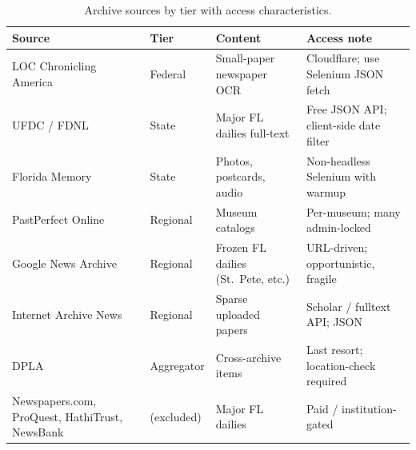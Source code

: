 \documentclass[11pt,letterpaper]{article}
\begin{document}
\begin{table}[H]
\centering
\small
\begin{tabular}{@{}p{3.2cm}p{2.2cm}p{4.2cm}p{4.8cm}@{}}
\toprule
\textbf{Source} & \textbf{Tier} & \textbf{Content} & \textbf{Access note} \\
\midrule
LOC Chronicling America & Federal & Small-paper newspaper OCR & Cloudflare; use Selenium JSON fetch \\
UFDC / FDNL & State & Major FL dailies full-text & Free JSON API; client-side date filter \\
Florida Memory & State & Photos, postcards, audio & Non-headless Selenium with warmup \\
PastPerfect Online & Regional & Museum catalogs & Per-museum; many admin-locked \\
Google News Archive & Regional & Frozen FL dailies (St.~Pete, etc.) & URL-driven; opportunistic, fragile \\
Internet Archive News & Regional & Sparse uploaded papers & Scholar / fulltext API; JSON \\
DPLA & Aggregator & Cross-archive items & Last resort; location-check required \\
Newspapers.com, ProQuest, HathiTrust, NewsBank & (excluded) & Major FL dailies & Paid / institution-gated \\
\bottomrule
\end{tabular}
\caption{Archive sources by tier with access characteristics.}
\label{tab:sources}
\end{table}
\end{document}
